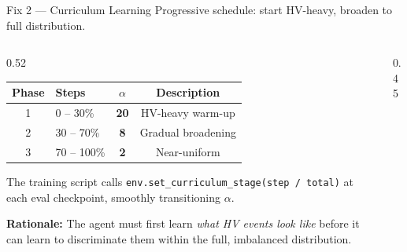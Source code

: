 \documentclass[aspectratio=169,10pt]{beamer}
\begin{document}
\begin{frame}{Fix 2 — Curriculum Learning}
  Progressive schedule: start HV-heavy, broaden to full distribution.

  \bigskip
  \begin{columns}[T]
    \begin{column}{0.52\textwidth}
      \begin{tabular}{clcc}
        \toprule
        Phase & Steps & $\alpha$ & Description \\
        \midrule
        1 & 0 – 30\% & \textbf{20} & HV-heavy warm-up \\
        2 & 30 – 70\% & \textbf{8} & Gradual broadening \\
        3 & 70 – 100\% & \textbf{2} & Near-uniform \\
        \bottomrule
      \end{tabular}

      \bigskip
      The training script calls
      \texttt{env.set\_curriculum\_stage(step / total)} at each eval
      checkpoint, smoothly transitioning $\alpha$.

      \bigskip
      \textbf{Rationale:} The agent must first learn \emph{what
      HV events look like} before it can learn to discriminate them
      within the full, imbalanced distribution.
    \end{column}
    \begin{column}{0.45\textwidth}
    \end{column}
  \end{columns}
\end{frame}
\end{document}
